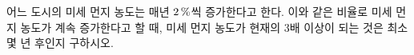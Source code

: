 어느 도시의 미세 먼지 농도는 매년 $2\mkern3mu \%$씩 증가한다고 한다. 이와 같은 비율로 미세 먼지 농도가 계속 증가한다고 할 때, 미세 먼지 농도가 현재의 3배 이상이 되는 것은 최소 몇 년 후인지 구하시오. 
